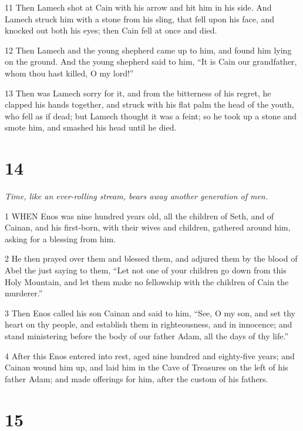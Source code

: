 \par 11 Then Lamech shot at Cain with his arrow and hit him in his side. And Lamech struck him with a stone from his sling, that fell upon his face, and knocked out both his eyes; then Cain fell at once and died.

\par 12 Then Lamech and the young shepherd came up to him, and found him lying on the ground. And the young shepherd said to him, “It is Cain our grandfather, whom thou hast killed, O my lord!”

\par 13 Then was Lamech sorry for it, and from the bitterness of his regret, he clapped his hands together, and struck with his flat palm the head of the youth, who fell as if dead; but Lamech thought it was a feint; so he took up a stone and smote him, and smashed his head until he died.

\chapter{14}

\par \textit{Time, like an ever-rolling stream, bears away another generation of men.}

\par 1 WHEN Enos was nine hundred years old, all the children of Seth, and of Cainan, and his first-born, with their wives and children, gathered around him, asking for a blessing from him.

\par 2 He then prayed over them and blessed them, and adjured them by the blood of Abel the just saying to them, “Let not one of your children go down from this Holy Mountain, and let them make no fellowship with the children of Cain the murderer.”

\par 3 Then Enos called his son Cainan and said to him, “See, O my son, and set thy heart on thy people, and establish them in righteousness, and in innocence; and stand ministering before the body of our father Adam, all the days of thy life.”

\par 4 After this Enos entered into rest, aged nine hundred and eighty-five years; and Cainan wound him up, and laid him in the Cave of Treasures on the left of his father Adam; and made offerings for him, after the custom of his fathers.

\chapter{15}

